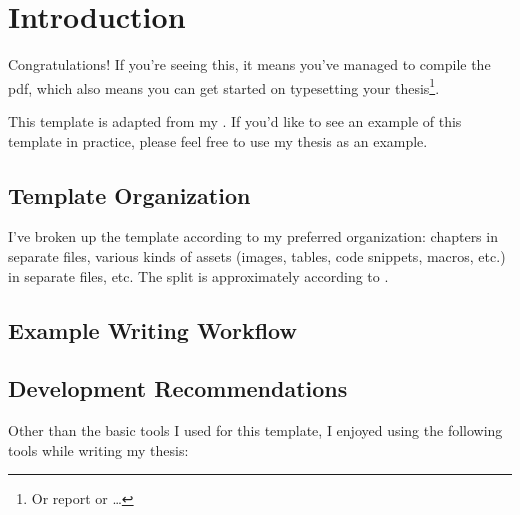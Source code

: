 \chapter{Introduction}
\label{chap:introduction}

Congratulations! If you're seeing this, it means you've managed to compile the
\acs{pdf}, which also means you can get started on typesetting your
thesis\footnote{Or report or \ldots{}}.

This template is adapted from my
.
If you'd like to see an example of this template in practice, please feel free
to use my thesis as an example.

\section{Template Organization}
\label{chap:introduction:sec:template-organization}

I've broken up the template according to my preferred organization: chapters in
separate files, various kinds of assets (images, tables, code snippets, macros,
etc.) in separate files, etc. The split is approximately according to
.

\organizationTable{}

\section{Example Writing Workflow}
\label{chap:introduction:sec:example-writing-workflow}


\section{Development Recommendations}
\label{chap:introduction:sec:development-recommendations}

Other than the basic tools I used for this template, I enjoyed using the
following tools while writing my thesis:


